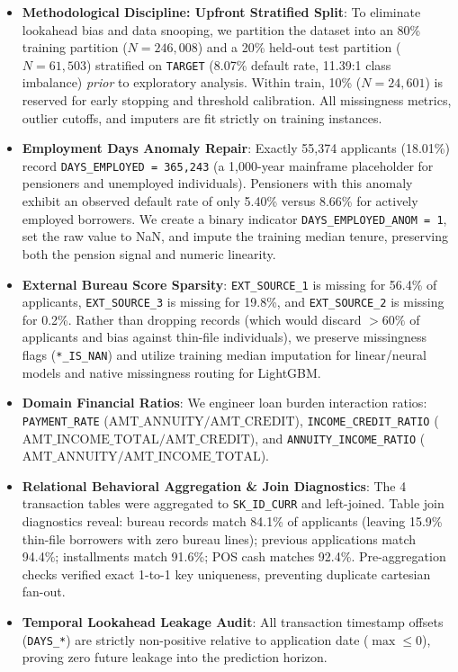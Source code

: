\documentclass[10pt,letterpaper]{article}
\newcommand{\mysubsection}[1]{\vspace{2pt}\noindent{\textbf{#1}}\vspace{1pt}}
\begin{document}
\mysubsection{Preprocessing \& Data Hygiene Pipeline}
\begin{itemize}\setlength{\itemsep}{1pt}\setlength{\parskip}{0pt}
    \item \textbf{Methodological Discipline: Upfront Stratified Split}: To eliminate lookahead bias and data snooping, we partition the dataset into an 80\% training partition ($N=246,008$) and a 20\% held-out test partition ($N=61,503$) stratified on \texttt{TARGET} (8.07\% default rate, 11.39:1 class imbalance) \textit{prior} to exploratory analysis. Within train, 10\% ($N=24,601$) is reserved for early stopping and threshold calibration. All missingness metrics, outlier cutoffs, and imputers are fit strictly on training instances.
    \item \textbf{Employment Days Anomaly Repair}: Exactly 55,374 applicants (18.01\%) record \texttt{DAYS\_EMPLOYED = 365,243} (a 1,000-year mainframe placeholder for pensioners and unemployed individuals). Pensioners with this anomaly exhibit an observed default rate of only 5.40\% versus 8.66\% for actively employed borrowers. We create a binary indicator \texttt{DAYS\_EMPLOYED\_ANOM = 1}, set the raw value to NaN, and impute the training median tenure, preserving both the pension signal and numeric linearity.
    \item \textbf{External Bureau Score Sparsity}: \texttt{EXT\_SOURCE\_1} is missing for 56.4\% of applicants, \texttt{EXT\_SOURCE\_3} is missing for 19.8\%, and \texttt{EXT\_SOURCE\_2} is missing for 0.2\%. Rather than dropping records (which would discard $>60\%$ of applicants and bias against thin-file individuals), we preserve missingness flags (\texttt{*\_IS\_NAN}) and utilize training median imputation for linear/neural models and native missingness routing for LightGBM.
    \item \textbf{Domain Financial Ratios}: We engineer loan burden interaction ratios: \texttt{PAYMENT\_RATE} ($\text{AMT\_ANNUITY}/\text{AMT\_CREDIT}$), \texttt{INCOME\_CREDIT\_RATIO} ($\text{AMT\_INCOME\_TOTAL}/\text{AMT\_CREDIT}$), and \texttt{ANNUITY\_INCOME\_RATIO} ($\text{AMT\_ANNUITY}/\text{AMT\_INCOME\_TOTAL}$).
    \item \textbf{Relational Behavioral Aggregation \& Join Diagnostics}: The 4 transaction tables were aggregated to \texttt{SK\_ID\_CURR} and left-joined. Table join diagnostics reveal: bureau records match 84.1\% of applicants (leaving 15.9\% thin-file borrowers with zero bureau lines); previous applications match 94.4\%; installments match 91.6\%; POS cash matches 92.4\%. Pre-aggregation checks verified exact 1-to-1 key uniqueness, preventing duplicate cartesian fan-out.
    \item \textbf{Temporal Lookahead Leakage Audit}: All transaction timestamp offsets (\texttt{DAYS\_*}) are strictly non-positive relative to application date ($\max \le 0$), proving zero future leakage into the prediction horizon.
\end{itemize}
\end{document}
